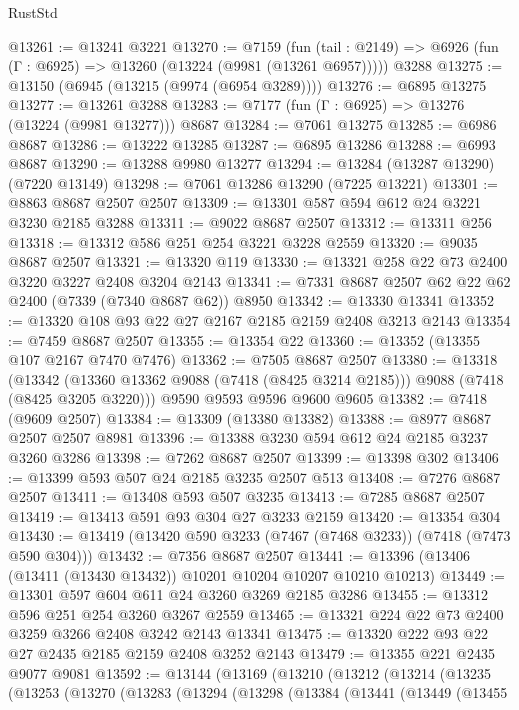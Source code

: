\begin{lexlean}{RustStd}
\begin{coremodule}
@13261 := @13241 @3221
@13270 := @7159
    (fun (tail : @2149) => @6926 (fun (Γ : @6925) => @13260 (@13224 (@9981 (@13261 @6957)))))
    @3288
@13275 := @13150 (@6945 (@13215 (@9974 (@6954 @3289))))
@13276 := @6895 @13275
@13277 := @13261 @3288
@13283 := @7177 (fun (Γ : @6925) => @13276 (@13224 (@9981 @13277))) @8687
@13284 := @7061 @13275
@13285 := @6986 @8687
@13286 := @13222 @13285
@13287 := @6895 @13286
@13288 := @6993 @8687
@13290 := @13288 @9980 @13277
@13294 := @13284 (@13287 @13290) (@7220 @13149)
@13298 := @7061 @13286 @13290 (@7225 @13221)
@13301 := @8863 @8687 @2507 @2507
@13309 := @13301 @587 @594 @612 @24 @3221 @3230 @2185 @3288
@13311 := @9022 @8687 @2507
@13312 := @13311 @256
@13318 := @13312 @586 @251 @254 @3221 @3228 @2559
@13320 := @9035 @8687 @2507
@13321 := @13320 @119
@13330 := @13321 @258 @22 @73 @2400 @3220 @3227 @2408 @3204 @2143
@13341 := @7331 @8687 @2507 @62 @22 @62 @2400 (@7339 (@7340 @8687 @62)) @8950
@13342 := @13330 @13341
@13352 := @13320 @108 @93 @22 @27 @2167 @2185 @2159 @2408 @3213 @2143
@13354 := @7459 @8687 @2507
@13355 := @13354 @22
@13360 := @13352 (@13355 @107 @2167 @7470 @7476)
@13362 := @7505 @8687 @2507
@13380 := @13318
    (@13342 (@13360 @13362 @9088 (@7418 (@8425 @3214 @2185))) @9088 (@7418 (@8425 @3205 @3220)))
    @9590
    @9593
    @9596
    @9600
    @9605
@13382 := @7418 (@9609 @2507)
@13384 := @13309 (@13380 @13382)
@13388 := @8977 @8687 @2507 @2507 @8981
@13396 := @13388 @3230 @594 @612 @24 @2185 @3237 @3260 @3286
@13398 := @7262 @8687 @2507
@13399 := @13398 @302
@13406 := @13399 @593 @507 @24 @2185 @3235 @2507 @513
@13408 := @7276 @8687 @2507
@13411 := @13408 @593 @507 @3235
@13413 := @7285 @8687 @2507
@13419 := @13413 @591 @93 @304 @27 @3233 @2159
@13420 := @13354 @304
@13430 := @13419 (@13420 @590 @3233 (@7467 (@7468 @3233)) (@7418 (@7473 @590 @304)))
@13432 := @7356 @8687 @2507
@13441 := @13396 (@13406 (@13411 (@13430 @13432)) @10201 @10204 @10207 @10210 @10213)
@13449 := @13301 @597 @604 @611 @24 @3260 @3269 @2185 @3286
@13455 := @13312 @596 @251 @254 @3260 @3267 @2559
@13465 := @13321 @224 @22 @73 @2400 @3259 @3266 @2408 @3242 @2143 @13341
@13475 := @13320 @222 @93 @22 @27 @2435 @2185 @2159 @2408 @3252 @2143
@13479 := @13355 @221 @2435 @9077 @9081
@13592 := @13144
    (@13169
      (@13210
        (@13212
          (@13214
            (@13235
              (@13253
                (@13270
                  (@13283
                    (@13294
                      (@13298
                        (@13384
                          (@13441
                            (@13449
                              (@13455

\end{coremodule}
\end{lexlean}
